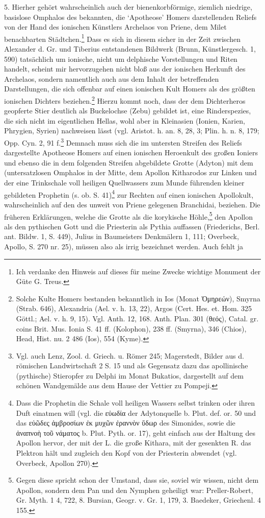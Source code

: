 \documentclass[a4paper, 11pt, oneside]{article}
\begin{document}
5. Hierher gehört wahrscheinlich auch der bienenkorbförmige, ziemlich niedrige, basislose Omphalos des bekannten, die `Apotheose' Homers darstellenden Reliefs von der Hand des ionischen Künstlers Archelaos von Priene, dem Milet benachbarten Städtchen.\footnote{Ich verdanke den Hinweis auf dieses für meine Zwecke wichtige Monument der Güte G. Treus.} Dass es sich in diesem sicher in der Zeit zwischen Alexander d. Gr. und Tiberius entstandenen Bildwerk (Brunn, Künstlergesch. 1, 590) tatsächlich um ionische, nicht um delphische Vorstellungen und Riten handelt, scheint mir hervorzugehen nicht bloß aus der ionischen Herkunft des Archelaos, sondern namentlich auch aus dem Inhalt der betreffenden Darstellungen, die sich offenbar auf einen ionischen Kult Homers als des größten ionischen Dichters beziehen.\footnote{Solche Kulte Homers bestanden bekanntlich in Ios (Monat Ὁμηρεών), Smyrna (Strab. 646), Alexandria (Ael. v. h. 13, 22), Argos (Cert. Hes. et. Hom. 325 Göttl.; Ael. v. h. 9, 15). Vgl. Anth. 12, 168. Anth. Plan. 301 (θεός), Catal. gr. coins Brit. Mus. Ionia S. 41 ff. (Kolophon), 238 ff. (Smyrna), 346 (Chios), Head, Hist. nu. 2 486 (Ios), 554 (Kyme).} Hierzu kommt noch, dass der dem Dichterheros geopferte Stier deutlich als Buckelochse (Zebu) gebildet ist, eine Rinderspezies, die sich nicht im eigentlichen Hellas, wohl aber in Kleinasien (Ionien, Karien, Phrygien, Syrien) nachweisen lässt (vgl. Aristot. h. an. 8, 28, 3; Plin. h. n. 8, 179; Opp. Cyn. 2, 91 f.\footnote{Vgl. auch Lenz, Zool. d. Griech. u. Römer 245; Magerstedt, Bilder aus d. römischen Landwirtschaft 2 S. 15 und als Gegensatz dazu das apollinische (pythische) Stieropfer zu Delphi im Monat Bukatios, dargestellt auf dem schönen Wandgemälde aus dem Hause der Vettier zu Pompeji.} Demnach muss sich die im untersten Streifen des Reliefs dargestellte Apotheose Homers auf einen ionischen Heroenkult des großen Ioniers und ebenso die in dem folgenden Streifen abgebildete Grotte (Adyton) mit dem (untersatzlosen Omphalos in der Mitte, dem Apollon Kitharodos zur Linken und der eine Trinkschale voll heiligen Quellwassers zum Munde führenden kleiner gebildeten Prophetin (s. ob. S. 41)\footnote{Dass die Prophetin die Schale voll heiligen Wassers selbst trinken oder ihren Duft einatmen will (vgl. die εὐωδία der Adytonquelle b. Plut. def. or. 50 und das εὐῶδες ἀμβροσίων ἐκ μυχῶν ἐραννὸν ὕδωρ des Simonides, sowie die ἀναπνοὴ τοῦ νάματος b. Plut. Pyth. or. 17), geht einfach aus der Haltung des Apollon hervor, der mit der L. die große Kithara, mit der gesenkten R. das Plektron hält und zugleich den Kopf von der Priesterin abwendet (vgl. Overbeck, Apollon 270).} zur Rechten auf einen ionischen Apollokult, wahrscheinlich auf den des unweit von Priene gelegenen Branchidai, beziehen. Die früheren Erklärungen, welche die Grotte als die korykische Höhle,\footnote{Gegen diese spricht schon der Umstand, dass sie, soviel wir wissen, nicht dem Apollon, sondern dem Pan und den Nymphen geheiligt war: Preller-Robert, Gr. Myth. 1 4, 722, 8. Bursian, Geogr. v. Gr. 1, 179, 3. Baedeker, Griechenl. 4 155.} den Apollon als den pythischen Gott und die Priesterin als Pythia auffassen (Friederichs, Berl. ant. Bildw. 1, S. 449), Julius in Baumeisters Denkmälern 1, 111; Overbeck, Apollo, S. 270 nr. 25), müssen also als irrig bezeichnet werden. Auch fehlt ja 
\end{document}

